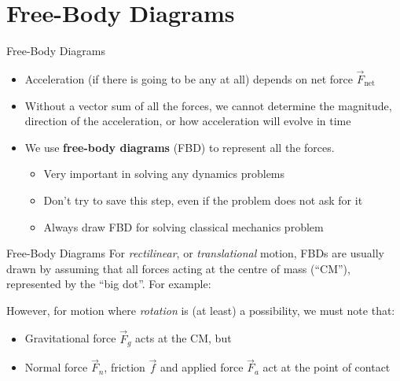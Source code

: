 \documentclass[12pt,compress,aspectratio=169]{beamer}
\begin{document}
\section{Free-Body Diagrams}

\begin{frame}{Free-Body Diagrams}
  \begin{itemize}
  \item Acceleration (if there is going to be any at all) depends
    on net force $\vec F_\text{net}$
  \item Without a vector sum of all the forces, we cannot determine the
    magnitude, direction of the acceleration, or how acceleration will evolve
    in time
  \item We use \textbf{free-body diagrams} (FBD) to represent all the forces.
    \begin{itemize}
    \item Very important in solving any dynamics problems
    \item Don't try to save this step, even if the problem does not ask for it
    \item Always draw FBD for solving classical mechanics problem
    \end{itemize}
  \end{itemize}
\end{frame}



\begin{frame}{Free-Body Diagrams}
  For \emph{rectilinear}, or \emph{translational} motion, FBDs are usually drawn
  by assuming that all forces acting at the centre of mass (``CM''),
  represented by the ``big dot''. For example:
  \begin{center}
  \end{center}
  However, for motion where \emph{rotation} is (at least) a possibility, we
  must note that:
  \begin{itemize}
  \item Gravitational force $\vec F_g$ acts at the CM, but
  \item Normal force $\vec F_n$, friction $\vec f$ and applied force $\vec F_a$
    act at the point of contact
  \end{itemize}
\end{frame}
\end{document}
